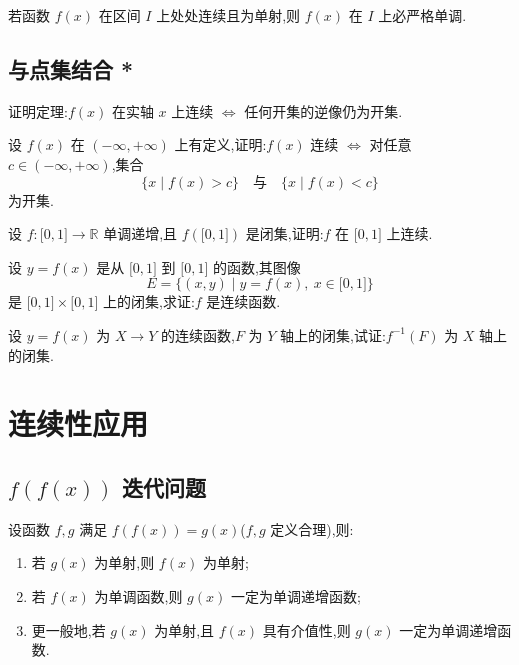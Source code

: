 \documentclass[../数学分析培优讲义.tex]{subfiles}
\begin{document}
\begin{corollary}[\markstar]
若函数 $f(x)$ 在区间 $I$ 上处处连续且为单射,则 $f(x)$ 在 $I$ 上必严格单调.
\end{corollary}


\newpage

\subsection{与点集结合 *}

\begin{example}
证明定理:$f(x)$ 在实轴 $x$ 上连续 $\Longleftrightarrow$ 任何开集的逆像仍为开集.
\end{example}
\exampleblank

\begin{example}
设 $f(x)$ 在 $(-\infty,+\infty)$ 上有定义,证明:$f(x)$ 连续 $\Longleftrightarrow$ 对任意 $c\in(-\infty,+\infty)$,集合
\[
    \{x\mid f(x)>c\}
    \quad\text{与}\quad
    \{x\mid f(x)<c\}
\]
为开集.
\end{example}
\exampleblank

\begin{example}
设 $f:\lbrack 0,1\rbrack\to\mathbb{R}$ 单调递增,且 $f(\lbrack 0,1\rbrack)$ 是闭集,证明:$f$ 在 $\lbrack 0,1\rbrack$ 上连续.
\end{example}
\exampleblank

\begin{example}
设 $y=f(x)$ 是从 $\lbrack 0,1\rbrack$ 到 $\lbrack 0,1\rbrack$ 的函数,其图像
\[
    E=\{(x,y)\mid y=f(x),\ x\in\lbrack 0,1\rbrack\}
\]
是 $\lbrack 0,1\rbrack\times\lbrack 0,1\rbrack$ 上的闭集,求证:$f$ 是连续函数.
\end{example}
\exampleblank

\begin{example}
设 $y=f(x)$ 为 $X\to Y$ 的连续函数,$F$ 为 $Y$ 轴上的闭集,试证:$f^{-1}(F)$ 为 $X$ 轴上的闭集.
\end{example}
\exampleblank


\newpage

\section{连续性应用}


\subsection{\texorpdfstring{$f(f(x))$}{f(f(x))} 迭代问题}

\begin{proposition}[\markstar]
设函数 $f,g$ 满足 $f(f(x))=g(x)$($f,g$ 定义合理),则:
\begin{enumerate}[label=(\arabic*)]
    \item 若 $g(x)$ 为单射,则 $f(x)$ 为单射;
    \item 若 $f(x)$ 为单调函数,则 $g(x)$ 一定为单调递增函数;
    \item 更一般地,若 $g(x)$ 为单射,且 $f(x)$ 具有介值性,则 $g(x)$ 一定为单调递增函数.
\end{enumerate}
\end{proposition}
\end{document}
